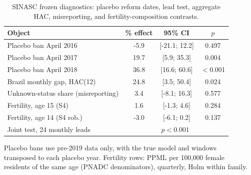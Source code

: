 \begin{table}[!htbp]
\centering
\caption{SINASC frozen diagnostics: placebo reform dates, lead test, aggregate HAC, misreporting, and fertility-composition contrasts.}
\label{tab:sinasc_diag}
\begingroup\small
\begin{tabular}{lccc}
  \hline
 Object & \% effect & 95\% CI & $p$ \\ 
  \hline
Placebo ban April 2016 & -5.9 & [-21.1; 12.2] & 0.497 \\
Placebo ban April 2017 & 19.7 & [5.9; 35.3] & 0.004 \\
Placebo ban April 2018 & 36.8 & [16.6; 60.6] & $<$0.001 \\
Brazil monthly gap, HAC(12) & 24.8 & [3.5; 50.4] & 0.024 \\
Unknown-status share (misreporting) & 3.4 & [-8.1; 16.3] & 0.577 \\
Fertility, age 15 (S4) & 1.6 & [-1.3; 4.6] & 0.284 \\
Fertility, age 14 (S4 rob.) & -3.0 & [-6.1; 0.2] & 0.137 \\
Joint test, 24 monthly leads & \multicolumn{3}{c}{$p < 0.001$} \\
  \hline
\end{tabular}
\endgroup
\par\smallskip\begingroup\footnotesize Placebo bans use pre-2019 data only, with the true model and windows transposed to each placebo year. Fertility rows: PPML per 100{,}000 female residents of the same age (PNADC denominators), quarterly, Holm within family.\endgroup
\end{table}
